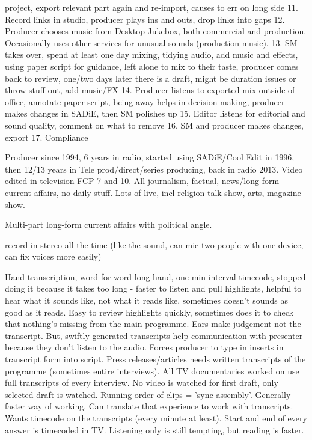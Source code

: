 project, export relevant part again and re-import, causes to err on long side
11. Record links in studio, producer plays ins and outs, drop links into gaps
12. Producer chooses music from Desktop Jukebox, both commercial and
production. Occasionally uses other services for unusual sounds (production
music). 
13. SM takes over, spend at least one day mixing, tidying audio, add music and
effects, using paper script for guidance, left alone to mix to their taste,
producer comes back to review, one/two days later there is a draft, might be
duration issues or throw stuff out, add music/FX
14. Producer listens to exported mix outside of office, annotate paper script,
being away helps in decision making, producer makes changes in SADiE, then SM
polishes up
15. Editor listens for editorial and sound quality, comment on what to remove
16. SM and producer makes changes, export
17. Compliance

Producer since 1994, 6 years in radio, started using SADiE/Cool Edit in 1996,
then 12/13 years in Tele prod/direct/series producing, back in radio 2013.
Video edited in television FCP 7 and 10. All journalism, factual,
news/long-form current affairs, no daily stuff. Lots of live, incl religion
talk-show, arts, magazine show.

Multi-part long-form current affairs with political angle.

record in stereo all the time (like the sound, can mic two people with one
device, can fix voices more easily)

Hand-transcription, word-for-word long-hand, one-min interval timecode, stopped
doing it because it takes too long - faster to listen and pull highlights,
helpful to hear what it sounds like, not what it reads like, sometimes doesn't
sounds as good as it reads. Easy to review highlights quickly, sometimes does
it to check that nothing's missing from the main programme. Ears make judgement
not the transcript. But, swiftly generated transcripts help communication with
presenter because they don't listen to the audio. Forces producer to type in
inserts in transcript form into script. Press releases/articles needs written
transcripts of the programme (sometimes entire interviews). All TV
documentaries worked on use full transcripts of every interview. No video is
watched for first draft, only selected draft is watched. Running order of clips
= 'sync assembly'. Generally faster way of working. Can translate that
experience to work with transcripts. Wants timecode on the transcripts (every
minute at least). Start and end of every answer is timecoded in TV. Listening
only is still tempting, but reading is faster.

